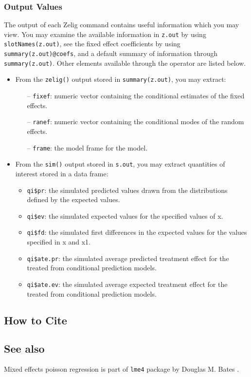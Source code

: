\subsubsection{Output Values}

The output of each Zelig command contains useful information which you may view. You may examine the available information in {\tt z.out} by using {\tt slotNames(z.out)}, see the fixed effect coefficients by using {\tt summary(z.out)@coefs}, and a default summary of information through {\tt summary(z.out)}. Other elements available through the {\tt \@} operator are listed below.
\begin{itemize}
\item From the {\tt zelig()} output stored in {\tt summary(z.out)}, you may extract:
\begin{itemize}
\item[--] {\tt fixef}: numeric vector containing the conditional estimates of the fixed effects.
\item[--] {\tt ranef}: numeric vector containing the conditional modes of the random effects.
\item[--] {\tt frame}: the model frame for the model.
\end{itemize}
\item From the {\tt sim()} output stored in {\tt s.out}, you may extract quantities of interest stored in a data frame:
\begin{itemize}
\item {\tt qi\$pr}: the simulated predicted values drawn from the distributions defined by the expected values.
\item {\tt qi\$ev}: the simulated expected values for the specified values of x.
\item {\tt qi\$fd}: the simulated first differences in the expected values for the values specified in x and x1.
\item {\tt qi\$ate.pr}: the simulated average predicted treatment effect for the treated from conditional prediction models.
\item {\tt qi\$ate.ev}: the simulated average expected treatment effect for the treated from conditional prediction models.
\end{itemize}
\end{itemize}



\subsection* {How to Cite}




\subsection* {See also}
Mixed effects poisson regression is part of {\tt lme4} package by Douglas M. Bates \citep{Bates07}.
